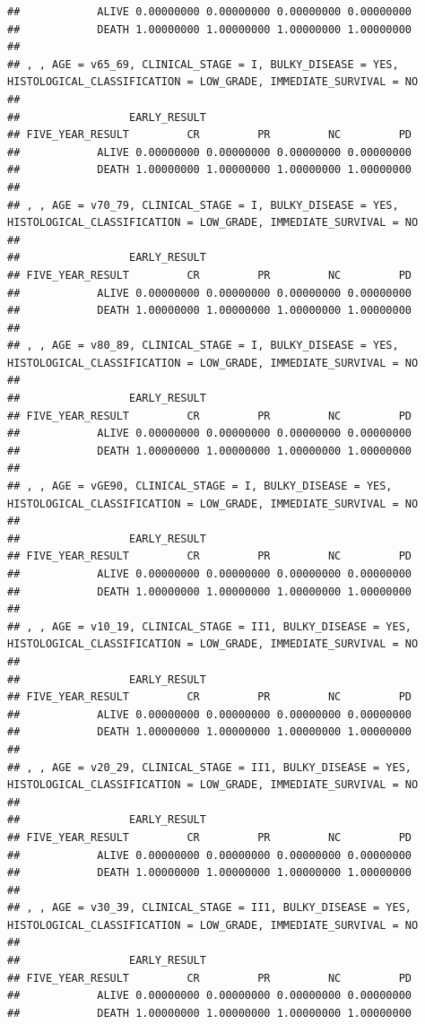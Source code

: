 \documentclass[]{article}
\begin{document}
\begin{verbatim}
##            ALIVE 0.00000000 0.00000000 0.00000000 0.00000000
##            DEATH 1.00000000 1.00000000 1.00000000 1.00000000
## 
## , , AGE = v65_69, CLINICAL_STAGE = I, BULKY_DISEASE = YES, HISTOLOGICAL_CLASSIFICATION = LOW_GRADE, IMMEDIATE_SURVIVAL = NO
## 
##                 EARLY_RESULT
## FIVE_YEAR_RESULT         CR         PR         NC         PD
##            ALIVE 0.00000000 0.00000000 0.00000000 0.00000000
##            DEATH 1.00000000 1.00000000 1.00000000 1.00000000
## 
## , , AGE = v70_79, CLINICAL_STAGE = I, BULKY_DISEASE = YES, HISTOLOGICAL_CLASSIFICATION = LOW_GRADE, IMMEDIATE_SURVIVAL = NO
## 
##                 EARLY_RESULT
## FIVE_YEAR_RESULT         CR         PR         NC         PD
##            ALIVE 0.00000000 0.00000000 0.00000000 0.00000000
##            DEATH 1.00000000 1.00000000 1.00000000 1.00000000
## 
## , , AGE = v80_89, CLINICAL_STAGE = I, BULKY_DISEASE = YES, HISTOLOGICAL_CLASSIFICATION = LOW_GRADE, IMMEDIATE_SURVIVAL = NO
## 
##                 EARLY_RESULT
## FIVE_YEAR_RESULT         CR         PR         NC         PD
##            ALIVE 0.00000000 0.00000000 0.00000000 0.00000000
##            DEATH 1.00000000 1.00000000 1.00000000 1.00000000
## 
## , , AGE = vGE90, CLINICAL_STAGE = I, BULKY_DISEASE = YES, HISTOLOGICAL_CLASSIFICATION = LOW_GRADE, IMMEDIATE_SURVIVAL = NO
## 
##                 EARLY_RESULT
## FIVE_YEAR_RESULT         CR         PR         NC         PD
##            ALIVE 0.00000000 0.00000000 0.00000000 0.00000000
##            DEATH 1.00000000 1.00000000 1.00000000 1.00000000
## 
## , , AGE = v10_19, CLINICAL_STAGE = II1, BULKY_DISEASE = YES, HISTOLOGICAL_CLASSIFICATION = LOW_GRADE, IMMEDIATE_SURVIVAL = NO
## 
##                 EARLY_RESULT
## FIVE_YEAR_RESULT         CR         PR         NC         PD
##            ALIVE 0.00000000 0.00000000 0.00000000 0.00000000
##            DEATH 1.00000000 1.00000000 1.00000000 1.00000000
## 
## , , AGE = v20_29, CLINICAL_STAGE = II1, BULKY_DISEASE = YES, HISTOLOGICAL_CLASSIFICATION = LOW_GRADE, IMMEDIATE_SURVIVAL = NO
## 
##                 EARLY_RESULT
## FIVE_YEAR_RESULT         CR         PR         NC         PD
##            ALIVE 0.00000000 0.00000000 0.00000000 0.00000000
##            DEATH 1.00000000 1.00000000 1.00000000 1.00000000
## 
## , , AGE = v30_39, CLINICAL_STAGE = II1, BULKY_DISEASE = YES, HISTOLOGICAL_CLASSIFICATION = LOW_GRADE, IMMEDIATE_SURVIVAL = NO
## 
##                 EARLY_RESULT
## FIVE_YEAR_RESULT         CR         PR         NC         PD
##            ALIVE 0.00000000 0.00000000 0.00000000 0.00000000
##            DEATH 1.00000000 1.00000000 1.00000000 1.00000000

\end{verbatim}
\end{document}
